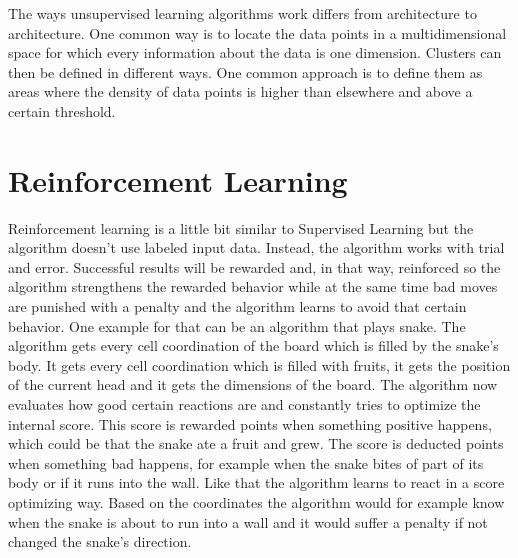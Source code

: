 \documentclass[a4paper,12pt]{report}
\begin{document}
	The ways unsupervised learning algorithms work differs from architecture to architecture. One common way is to locate the data points in a multidimensional space for which every information about the data is one dimension. Clusters can then be defined in different ways. One common approach is to define them as areas where the density of data points is higher than elsewhere and above a certain threshold.\\
	\section{Reinforcement Learning}
	Reinforcement learning is a little bit similar to Supervised Learning but the algorithm doesn't use labeled input data. Instead, the algorithm works with trial and error. Successful results will be rewarded and, in that way, reinforced so the algorithm strengthens the rewarded behavior while at the same time bad moves are punished with a penalty and the algorithm learns to avoid that certain behavior. One example for that can be an algorithm that plays snake. The algorithm gets every cell coordination of the board which is filled by the snake's body. It gets every cell coordination which is filled with fruits, it gets the position of the current head and it gets the dimensions of the board. The algorithm now evaluates how good certain reactions are and constantly tries to optimize the internal score. This score is rewarded points when something positive happens, which could be that the snake ate a fruit and grew. The score is deducted points when something bad happens, for example when the snake bites of part of its body or if it runs into the wall. Like that the algorithm learns to react in a score optimizing way. Based on the coordinates the algorithm would for example know when the snake is about to run into a wall and it would suffer a penalty if not changed the snake's direction.\\\\\\\\
	
\end{document}
